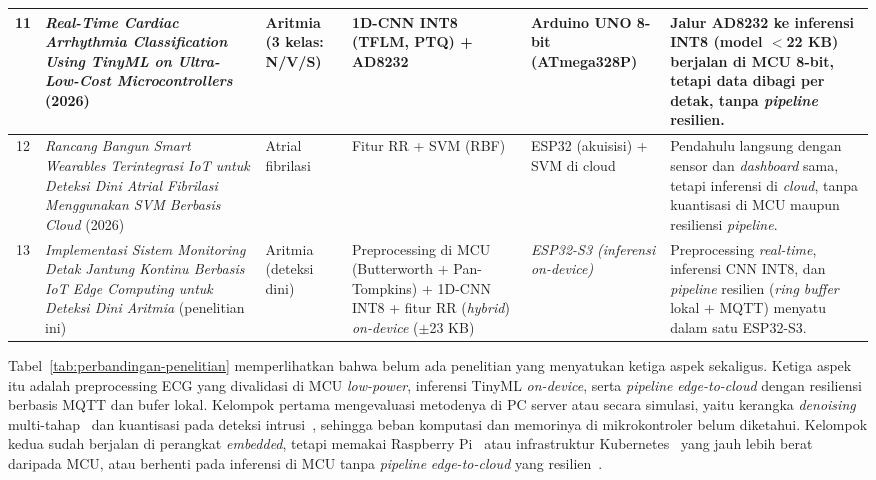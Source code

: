 {\begin{longtable}{|c|L{3.5cm}|L{2.0cm}|L{2.0cm}|L{1.8cm}|L{2.8cm}|}
11 & \textit{Real-Time Cardiac Arrhythmia Classification Using TinyML on Ultra-Low-Cost Microcontrollers} (2026) & Aritmia (3 kelas: N/V/S) & 1D-CNN INT8 (TFLM, PTQ) + AD8232 & Arduino UNO 8-bit (ATmega328P) & Jalur AD8232 ke inferensi INT8 (model $<$22 KB) berjalan di MCU 8-bit, tetapi data dibagi per detak, tanpa \textit{pipeline} resilien. \\ \hline

12 & \textit{Rancang Bangun Smart Wearables Terintegrasi IoT untuk Deteksi Dini Atrial Fibrilasi Menggunakan SVM Berbasis Cloud} (2026) & Atrial fibrilasi & Fitur RR + SVM (RBF) & ESP32 (akuisisi) + SVM di cloud & Pendahulu langsung dengan sensor dan \textit{dashboard} sama, tetapi inferensi di \textit{cloud}, tanpa kuantisasi di MCU maupun resiliensi \textit{pipeline}. \\ \hline

13 & \textit{Implementasi Sistem Monitoring Detak Jantung Kontinu Berbasis IoT Edge Computing untuk Deteksi Dini Aritmia} (penelitian ini) & Aritmia (deteksi dini) & Preprocessing di MCU (Butterworth + Pan-Tompkins) + 1D-CNN INT8 + fitur RR (\textit{hybrid}) \textit{on-device} ($\pm$23 KB) & \textit{ESP32-S3 (inferensi on-device)} & Preprocessing \textit{real-time}, inferensi CNN INT8, dan \textit{pipeline} resilien (\textit{ring buffer} lokal + MQTT) menyatu dalam satu ESP32-S3. \\ \hline

\end{longtable}
}

Tabel~\ref{tab:perbandingan-penelitian} memperlihatkan bahwa belum ada penelitian yang menyatukan ketiga aspek sekaligus. Ketiga aspek itu adalah preprocessing ECG yang divalidasi di MCU \textit{low-power}, inferensi TinyML \textit{on-device}, serta \textit{pipeline} \textit{edge-to-cloud} dengan resiliensi berbasis MQTT dan bufer lokal. Kelompok pertama mengevaluasi metodenya di PC server atau secara simulasi, yaitu kerangka \textit{denoising} multi-tahap~\cite{xie_2021} dan kuantisasi pada deteksi intrusi~\cite{laiu_2026}, sehingga beban komputasi dan memorinya di mikrokontroler belum diketahui. Kelompok kedua sudah berjalan di perangkat \textit{embedded}, tetapi memakai Raspberry Pi~\cite{karri_2023} atau infrastruktur Kubernetes~\cite{resilient_edge_cloud} yang jauh lebih berat daripada MCU, atau berhenti pada inferensi di MCU tanpa \textit{pipeline} \textit{edge-to-cloud} yang resilien~\cite{kim_2023}.

